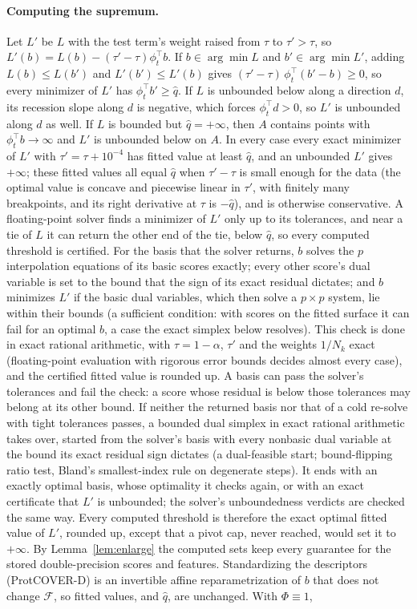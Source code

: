 \paragraph{Computing the supremum.}
Let $L'$ be $L$ with the test term's weight raised from $\tau$ to $\tau'>\tau$, so $L'(b)=L(b)-(\tau'-\tau)\phi_t^\top b$. If $b\in\arg\min L$ and $b'\in\arg\min L'$, adding $L(b)\le L(b')$ and $L'(b')\le L'(b)$ gives $(\tau'-\tau)\,\phi_t^\top(b'-b)\ge0$, so every minimizer of $L'$ has $\phi_t^\top b'\ge\hat q$. If $L$ is unbounded below along a direction $d$, its recession slope along $d$ is negative, which forces $\phi_t^\top d>0$, so $L'$ is unbounded along $d$ as well. If $L$ is bounded but $\hat q=+\infty$, then $A$ contains points with $\phi_t^\top b\to\infty$ and $L'$ is unbounded below on $A$. In every case every exact minimizer of $L'$ with $\tau'=\tau+10^{-4}$ has fitted value at least $\hat q$, and an unbounded $L'$ gives $+\infty$; these fitted values all equal $\hat q$ when $\tau'-\tau$ is small enough for the data (the optimal value is concave and piecewise linear in $\tau'$, with finitely many breakpoints, and its right derivative at $\tau$ is $-\hat q$), and is otherwise conservative. A floating-point solver finds a minimizer of $L'$ only up to its tolerances, and near a tie of $L$ it can return the other end of the tie, below $\hat q$, so every computed threshold is certified. For the basis that the solver returns, $b$ solves the $p$ interpolation equations of its basic scores exactly; every other score's dual variable is set to the bound that the sign of its exact residual dictates; and $b$ minimizes $L'$ if the basic dual variables, which then solve a $p\times p$ system, lie within their bounds (a sufficient condition: with scores on the fitted surface it can fail for an optimal $b$, a case the exact simplex below resolves). This check is done in exact rational arithmetic, with $\tau=1-\alpha$, $\tau'$ and the weights $1/N_k$ exact (floating-point evaluation with rigorous error bounds decides almost every case), and the certified fitted value is rounded up. A basis can pass the solver's tolerances and fail the check: a score whose residual is below those tolerances may belong at its other bound. If neither the returned basis nor that of a cold re-solve with tight tolerances passes, a bounded dual simplex in exact rational arithmetic takes over, started from the solver's basis with every nonbasic dual variable at the bound its exact residual sign dictates (a dual-feasible start; bound-flipping ratio test, Bland's smallest-index rule on degenerate steps). It ends with an exactly optimal basis, whose optimality it checks again, or with an exact certificate that $L'$ is unbounded; the solver's unboundedness verdicts are checked the same way. Every computed threshold is therefore the exact optimal fitted value of $L'$, rounded up, except that a pivot cap, never reached, would set it to $+\infty$. By Lemma~\ref{lem:enlarge} the computed sets keep every guarantee for the stored double-precision scores and features. Standardizing the descriptors (ProtCOVER-D) is an invertible affine reparametrization of $b$ that does not change $\mathcal{F}$, so fitted values, and $\hat q$, are unchanged. With $\Phi\equiv1$, 
